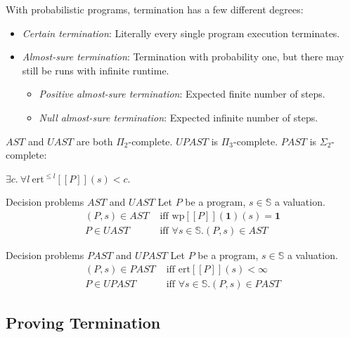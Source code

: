 \documentclass[english]{panikzettel}
\renewcommand{\wp}{\mathrm{wp}}
\newcommand{\ert}{\mathrm{ert}}
\begin{document}
\begin{halfboxl}
	With probabilistic programs, termination has a few different degrees:
	\begin{itemize}[leftmargin=*]
		\item \emph{Certain termination}: Literally every single program execution terminates.
		\item \emph{Almost-sure termination}: Termination with probability one, but there may still be runs with infinite runtime.
		      \begin{itemize}
			      \item[+] \emph{Positive almost-sure termination}: Expected finite number of steps.
			      \item[+] \emph{Null almost-sure termination}: Expected infinite number of steps.
		      \end{itemize}
	\end{itemize}

	$AST$ and $UAST$ are both $\Pi_2$-complete.
	$UPAST$ is $\Pi_3$-complete.
	$PAST$ is $\Sigma_2$-complete:
	\begin{tightcenter}
		$\exists c.\ \forall l\ \ert^{\leq l} [\![P]\!](s) < c$.
	\end{tightcenter}
\end{halfboxl}%
\begin{halfboxr}
	\vspace{-\baselineskip}
	\begin{defi}{Decision problems $AST$ and $UAST$}
		Let $P$ be a program, $s \in \mathbb{S}$ a valuation.
		\begin{align*}
			(P,s) \in AST & \text{ iff } \wp[\![P]\!](\mathbf{1})(s)=\mathbf{1}  \\
			P \in UAST    & \text{ iff } \forall s \in \mathbb{S}. (P,s) \in AST
		\end{align*}
	\end{defi}

	\begin{defi}{Decision problems $PAST$ and $UPAST$}
		Let $P$ be a program, $s \in \mathbb{S}$ a valuation.
		\begin{align*}
			(P,s) \in PAST & \text{ iff } \ert[\![P]\!](s) < \infty                \\
			P \in UPAST    & \text{ iff } \forall s \in \mathbb{S}. (P,s) \in PAST
		\end{align*}
	\end{defi}
\end{halfboxr}

\subsection{Proving Termination}
\end{document}
